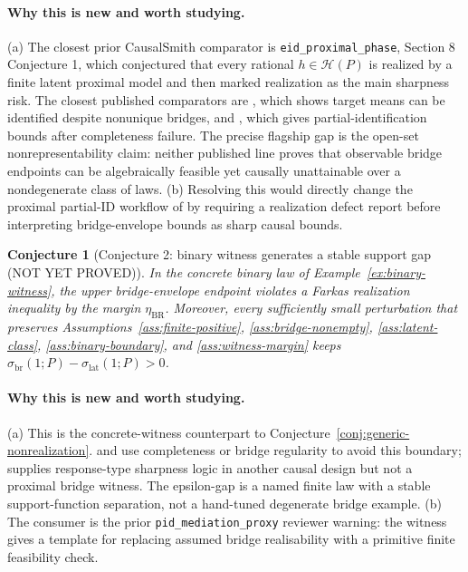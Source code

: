 \documentclass[11pt]{article}
\theoremstyle{definition}
\theoremstyle{plain}
\newtheorem{conjecture}{Conjecture}
\theoremstyle{remark}
\begin{document}
\paragraph{Why this is new and worth studying.}
(a) The closest prior CausalSmith comparator is
\texttt{eid\_proximal\_phase}, Section 8 Conjecture 1, which conjectured that
every rational \(h\in\mathcal H(P)\) is realized by a finite latent proximal
model and then marked realization as the main sharpness risk.  The closest
published comparators are \citet[abstract and Sections 2--3]{ZhangLiMiaoTchetgen2023},
which shows target means can be identified despite nonunique bridges, and
\citet[abstract and Sections 3--4]{GhassamiShpitserTchetgen2023}, which gives
partial-identification bounds after completeness failure.  The precise
flagship gap is the open-set nonrepresentability claim: neither published line
proves that observable bridge endpoints can be algebraically feasible yet
causally unattainable over a nondegenerate class of laws.  (b) Resolving this
would directly change the proximal partial-ID workflow of
\citet{GhassamiShpitserTchetgen2023} by requiring a realization defect report
before interpreting bridge-envelope bounds as sharp causal bounds.

\begin{conjecture}[Conjecture 2: binary witness generates a stable support gap (NOT YET PROVED)]\label{conj:binary-witness}
In the concrete binary law of Example~\ref{ex:binary-witness}, the upper
bridge-envelope endpoint violates a Farkas realization inequality by the margin
\(\eta_{\mathrm{BR}}\).  Moreover, every sufficiently small perturbation that
preserves Assumptions~\ref{ass:finite-positive}, \ref{ass:bridge-nonempty},
\ref{ass:latent-class}, \ref{ass:binary-boundary}, and
\ref{ass:witness-margin} keeps
\(\sigma_{\mathrm{br}}(1;P)-\sigma_{\mathrm{lat}}(1;P)>0\).
\end{conjecture}
\paragraph{Why this is new and worth studying.}
(a) This is the concrete-witness counterpart to Conjecture~\ref{conj:generic-nonrealization}.
\citet{MiaoGengTchetgen2018} and \citet{CuiPuShiMiaoTchetgen2024} use
completeness or bridge regularity to avoid this boundary; \citet{BalkePearl1997}
supplies response-type sharpness logic in another causal design but not a
proximal bridge witness.  The epsilon-gap is a named finite law with a stable
support-function separation, not a hand-tuned degenerate bridge example.
(b) The consumer is the prior \texttt{pid\_mediation\_proxy} reviewer warning:
the witness gives a template for replacing assumed bridge realisability with a
primitive finite feasibility check.
\end{document}
